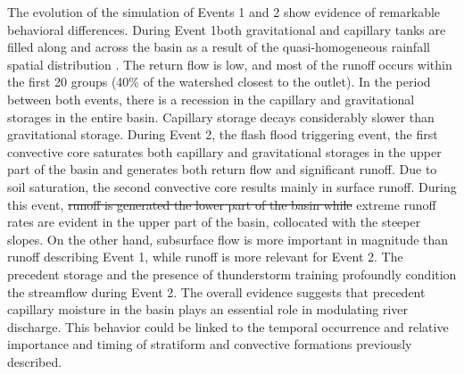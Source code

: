 \documentclass[hess, manuscript]{copernicus}
\providecommand{\DIFadd}[1]{{\protect\color{blue}\uwave{#1}}} %
\providecommand{\DIFdel}[1]{{\protect\color{red}\sout{#1}}}                      %
\providecommand{\DIFaddbegin}{} %
\providecommand{\DIFaddend}{} %
\providecommand{\DIFdelbegin}{} %
\providecommand{\DIFdelend}{} %
\begin{document}
The evolution of the simulation of Events 1 and 2 show evidence of remarkable behavioral differences. During Event 1\DIFaddbegin \DIFadd{, }\DIFaddend both gravitational and capillary tanks are filled along and across the basin as a result of the quasi-homogeneous rainfall spatial distribution \DIFaddbegin \DIFadd{\mbox{%
\citep{Zoccatelli2011}}\hspace{0pt}%
}\DIFaddend . The return flow is low, and most of the runoff occurs within the first 20 groups (40\% of the watershed closest to the outlet). In the period between both events, there is a recession in the capillary and gravitational storages in the entire basin. Capillary storage decays considerably slower than gravitational storage. During Event 2, the flash flood triggering event, the first convective core saturates both capillary and gravitational storages in the upper part of the basin and generates both return flow and significant runoff. Due to soil saturation, the second convective core results mainly in surface runoff. During this event, \DIFdelbegin \DIFdel{runoff is generated the lower part of the basin while }\DIFdelend extreme runoff rates are evident in the upper part of the basin, collocated with the steeper slopes. On the other hand, subsurface flow is more important in magnitude than runoff describing Event 1, while runoff is more relevant for Event 2. The precedent storage and the presence of thunderstorm training profoundly condition the streamflow during Event 2. The overall evidence suggests that precedent capillary moisture in the basin plays an essential role in modulating river discharge. This behavior could be linked to the temporal occurrence and relative importance and timing of stratiform and convective formations previously described. \\
\end{document}
